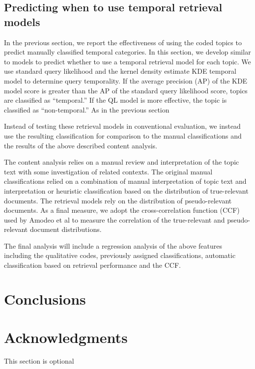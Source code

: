 \documentclass{sig-alternate}
\begin{document}
\subsection{Predicting when to use temporal retrieval models}

In the previous section, we report the effectiveness of using the coded topics to predict manually classified temporal categories. In this section, we develop similar to models to predict whether to use a temporal retrieval model for each topic. We use standard query likelihood \cite{XXX} and the kernel density estimate {KDE} temporal model \cite{Efron2014} to determine query temporality. If the average precision (AP) of the KDE model score is greater than the AP of the standard query likelihood score, topics are classified as ``temporal.''  If the QL model is more effective, the topic is classified as ``non-temporal.'' As in the previous section

Instead of testing these retrieval models in conventional evaluation, we instead use the resulting classification for comparison to the manual classifications and the results of the above described content analysis.

The content analysis relies on a manual review and interpretation of the topic text with some investigation of related contexts. The original manual classifications relied on a combination of manual interpretation of topic text and interpretation or heuristic classification based on the distribution of true-relevant documents. The retrieval models rely on the distribution of pseudo-relevant documents. As a final measure, we adopt the cross-correlation function (CCF) used by Amodeo et al \cite{Amodeo2011} to measure the correlation of the true-relevant and pseudo-relevant document distributions. 

The final analysis will include a regression analysis of the above features including the qualitative codes, previously assigned classifications, automatic classification based on retrieval performance and the CCF.


\section{Conclusions}


\section{Acknowledgments}
This section is optional
\end{document}
